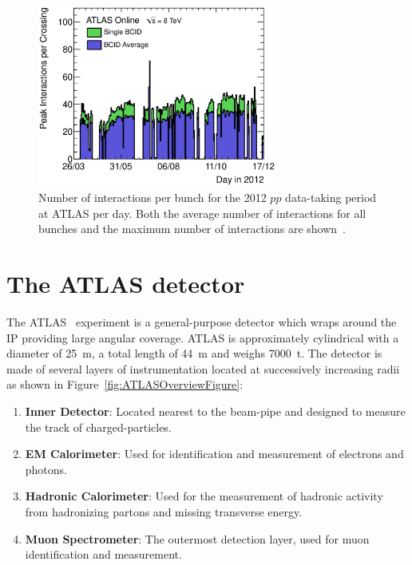 \begin{figure}[htbp]
  \centering
    \includegraphics[width=0.70\textwidth]{PartDetector/Plots/peakBothMuByDay.eps}
    \caption[Number of interactions per bunch for the 2012 $pp$ data-taking period at ATLAS per day.]{Number of interactions per bunch for the 2012 $pp$ data-taking period at ATLAS per day. Both the average number of interactions for all bunches and the maximum number of interactions are shown~\cite{Detector:LuminosityResults}.}
  \label{fig:DetectorBunchCrossingInteractions}
\end{figure}

\section{The ATLAS detector} \label{sec:the_atlas_detector}

The ATLAS~\cite{Detector:ATLASExperimentGeneral} experiment is a general-purpose detector which wraps around the IP providing large angular coverage. ATLAS is approximately cylindrical with a diameter of \SI{25}{\meter}, a total length of \SI{44}{\meter} and weighs \SI{7000}{\tonne}. The detector is made of several layers of instrumentation located at successively increasing radii as shown in Figure~\ref{fig:ATLASOverviewFigure}:

\begin{enumerate}
  \item \textbf{Inner Detector}: Located nearest to the beam-pipe and designed to measure the track of charged-particles.
  \item \textbf{EM Calorimeter}: Used for identification and measurement of electrons and photons.
  \item \textbf{Hadronic Calorimeter}: Used for the measurement of hadronic activity from hadronizing partons and missing transverse energy.
  \item \textbf{Muon Spectrometer}: The outermost detection layer, used for muon identification and measurement.
\end{enumerate}

